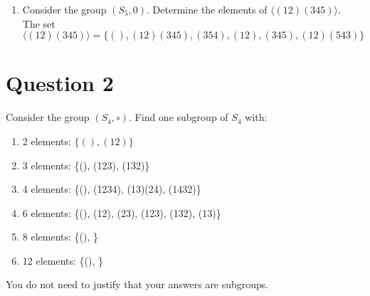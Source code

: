 \documentclass[12pt]{article}
\def\g{\langle g \rangle}
\begin{document}
\begin{enumerate}[label=\alph*)]
\begin{proof}
\begin{equation*}
                \begin{split}
                    g^n \circ g^{-m} &= e.
                \end{split}
            \end{equation*}
            Now, \(g^n \circ g^{-m}\in\g\) because \(e\in\g\). Therefore, \(g^n \circ g^{-m}\in\g\) for all \(m, n\in\Z\).
        \end{proof}
        \item Consider the group \((S_5, 0)\). Determine the elements of \(\langle (12)(345) \rangle\).\\
        The set \(\langle (12)(345) \rangle = \{(), (12)(345), (354), (12), (345), (12)(543)\}\)
    \end{enumerate}

    \section*{Question 2}
    Consider the group \((S_4, \circ )\). Find one subgroup of \(S_4\) with:
    \begin{enumerate}[label=\alph*)]
        \item 2 elements: \(\{(), (12)\}\)
        \item 3 elements: \{(), (123), (132)\}
        \item 4 elements: \{(), (1234), (13)(24), (1432)\}
        \item 6 elements: \{(), (12), (23), (123), (132), (13)\}
        \item 8 elements: \{(), \}
        \item 12 elements: \{(), \}
    \end{enumerate}
    You do not need to justify that your answers are subgroups.
\end{document}
